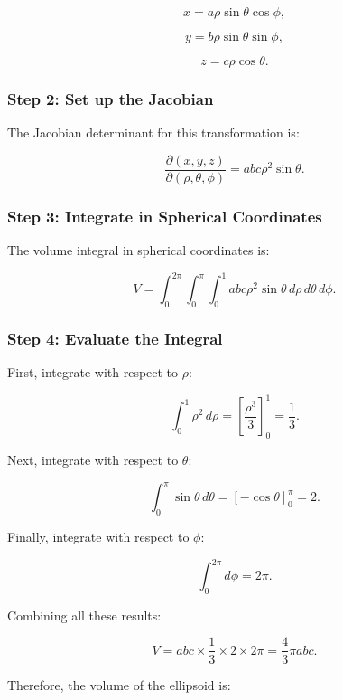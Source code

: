 \documentclass{article}
\begin{document}
\[
x = a \rho \sin\theta \cos\phi,
\]




\[
y = b \rho \sin\theta \sin\phi,
\]




\[
z = c \rho \cos\theta.
\]



\subsubsection*{Step 2: Set up the Jacobian}
The Jacobian determinant for this transformation is:


\[
\frac{\partial(x, y, z)}{\partial(\rho, \theta, \phi)} = abc \rho^2 \sin\theta.
\]



\subsubsection*{Step 3: Integrate in Spherical Coordinates}
The volume integral in spherical coordinates is:


\[
V = \int_0^{2\pi} \int_0^{\pi} \int_0^1 abc \rho^2 \sin\theta \, d\rho \, d\theta \, d\phi.
\]



\subsubsection*{Step 4: Evaluate the Integral}
First, integrate with respect to \( \rho \):


\[
\int_0^1 \rho^2 \, d\rho = \left[ \frac{\rho^3}{3} \right]_0^1 = \frac{1}{3}.
\]



Next, integrate with respect to \( \theta \):


\[
\int_0^{\pi} \sin\theta \, d\theta = \left[ -\cos\theta \right]_0^{\pi} = 2.
\]



Finally, integrate with respect to \( \phi \):


\[
\int_0^{2\pi} d\phi = 2\pi.
\]



Combining all these results:


\[
V = abc \times \frac{1}{3} \times 2 \times 2\pi = \frac{4}{3} \pi abc.
\]



Therefore, the volume of the ellipsoid is:
\end{document}
